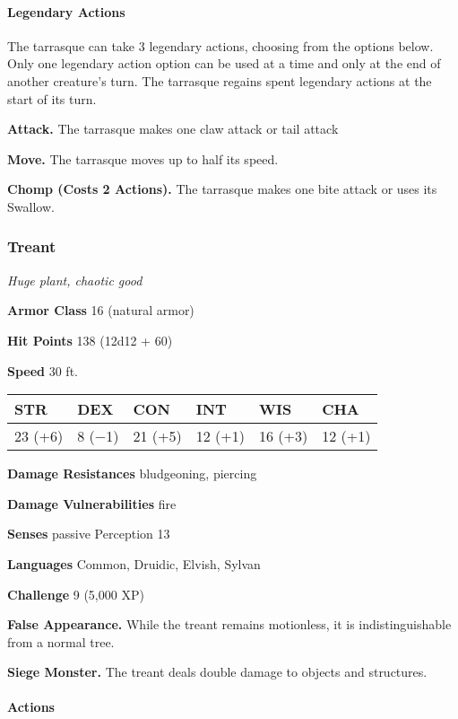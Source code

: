 \documentclass[
]{article}
\begin{document}
\hypertarget{legendary-actions}{%
\paragraph{Legendary Actions}\label{legendary-actions}}

The tarrasque can take 3 legendary actions, choosing from the options
below. Only one legendary action option can be used at a time and only
at the end of another creature's turn. The tarrasque regains spent
legendary actions at the start of its turn.

\textbf{Attack.} The tarrasque makes one claw attack or tail attack

\textbf{Move.} The tarrasque moves up to half its speed.

\textbf{Chomp (Costs 2 Actions).} The tarrasque makes one bite attack or
uses its Swallow.

\hypertarget{treant}{%
\subsubsection{Treant}\label{treant}}

\emph{Huge plant, chaotic good}

\textbf{Armor Class} 16 (natural armor)

\textbf{Hit Points} 138 (12d12 + 60)

\textbf{Speed} 30 ft.

\begin{longtable}[]{@{}llllll@{}}
\toprule
STR & DEX & CON & INT & WIS & CHA\tabularnewline
\midrule
\endhead
23 (+6) & 8 (−1) & 21 (+5) & 12 (+1) & 16 (+3) & 12 (+1)\tabularnewline
\bottomrule
\end{longtable}

\textbf{Damage Resistances} bludgeoning, piercing

\textbf{Damage Vulnerabilities} fire

\textbf{Senses} passive Perception 13

\textbf{Languages} Common, Druidic, Elvish, Sylvan

\textbf{Challenge} 9 (5,000 XP)

\textbf{False Appearance.} While the treant remains motionless, it is
indistinguishable from a normal tree.

\textbf{Siege Monster.} The treant deals double damage to objects and
structures.

\hypertarget{actions-1}{%
\paragraph{Actions}\label{actions-1}}
\end{document}
